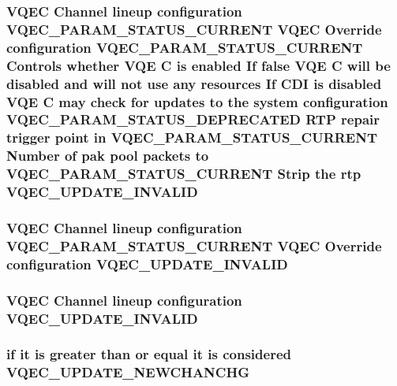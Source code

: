 \subsubsection{\setlength{\rightskip}{0pt plus 5cm}VQEC Channel lineup configuration VQEC\_\-PARAM\_\-STATUS\_\-CURRENT VQEC Override configuration VQEC\_\-PARAM\_\-STATUS\_\-CURRENT Controls whether VQE \bf{C} is enabled If false VQE \bf{C} will be disabled and will not use any resources If CDI is disabled VQE \bf{C} may check for updates \bf{to} the system configuration VQEC\_\-PARAM\_\-STATUS\_\-DEPRECATED RTP repair trigger point in VQEC\_\-PARAM\_\-STATUS\_\-CURRENT Number of pak pool packets \bf{to} VQEC\_\-PARAM\_\-STATUS\_\-CURRENT Strip the rtp \bf{VQEC\_\-UPDATE\_\-INVALID}}\label{vqec__cfg__settings_8h_d0ccea016358f79c551c2365a6db75cd}


\subsubsection{\setlength{\rightskip}{0pt plus 5cm}VQEC Channel lineup configuration VQEC\_\-PARAM\_\-STATUS\_\-CURRENT VQEC Override configuration \bf{VQEC\_\-UPDATE\_\-INVALID}}\label{vqec__cfg__settings_8h_e99f7fea410e4130955ba0b61059b4cc}


\subsubsection{\setlength{\rightskip}{0pt plus 5cm}VQEC Channel lineup configuration \bf{VQEC\_\-UPDATE\_\-INVALID}}\label{vqec__cfg__settings_8h_f356fb29bbc5c5d34c3beaa9352b5c7e}


\subsubsection{\setlength{\rightskip}{0pt plus 5cm}if it is greater than or equal it is considered \bf{VQEC\_\-UPDATE\_\-NEWCHANCHG}}\label{vqec__cfg__settings_8h_267a52857e201e6deeffa843d346aae8}


